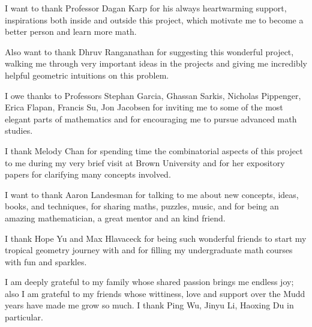 \documentclass[mathematics]{hmcthesis}
\begin{document}
\begin{acknowledgments}
	I want to thank Professor Dagan Karp 
	for his always heartwarming support, 
	inspirations both inside and outside this project,
	which motivate me to become a better person 
	and learn more math.

	Also want to thank Dhruv Ranganathan 
	for suggesting this wonderful project, 
	walking me through very important ideas in the projects
	and giving me incredibly helpful geometric intuitions on this problem.

	I owe thanks to Professors Stephan Garcia, Ghassan Sarkis, Nicholas Pippenger, Erica Flapan, Francis Su, Jon Jacobsen
	for inviting me to some of the most elegant parts of mathematics and for encouraging me to pursue advanced math studies. 
	
	I thank Melody Chan for spending time 
	the combinatorial aspects of this project to me 
	during my very brief visit at Brown University
	and for her expository papers for clarifying many concepts involved.

	I want to thank Aaron Landesman for talking to me about new concepts,
    ideas, books, and techniques, for sharing maths, puzzles, music, and for being an amazing mathematician, a great mentor and an kind friend.

	I thank Hope Yu and Max Hlavaceck for being such wonderful friends to start my tropical geometry journey with
	and for filling my undergraduate math courses with fun and sparkles.

	I am deeply grateful to my family 
	whose shared passion brings me endless joy; also I am grateful to my friends 
	whose wittiness, love 
	and support over the Mudd years have made me grow so much. 
	I thank Ping Wu, Jinyu Li, Haoxing Du in particular.  
\end{acknowledgments}
\mainmatter

% 
%     


     
    
    
    

    
    
    
\end{document}
